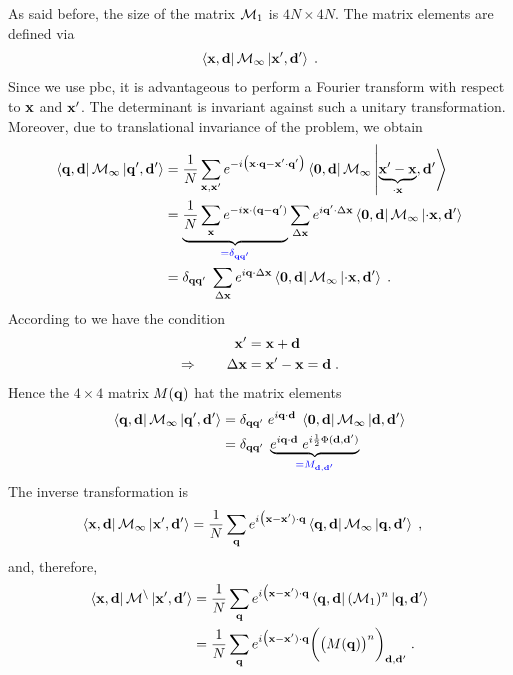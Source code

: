 As said before, the size of the matrix ${\cal M}_{1}$ is $4N\times 4N$. The matrix elements are defined via
%
\begin{align*}
\bra{\mathbf x,\mathbf d} {\cal M}_{1}\ket{\mathbf x',\mathbf d'}\;.
\end{align*}
%
Since we use pbc, it is advantageous to perform a Fourier transform with respect to $\mathbf x$ and 
$\mathbf x'$. The determinant is invariant against such a unitary transformation. Moreover, due to
translational invariance of the problem, we obtain
%
\begin{align*}
\bra{\mathbf q,\mathbf d} {\cal M}_{1}\ket{\mathbf q',\mathbf d'}&=
\frac{1}{N}\sum_{\mathbf x,\mathbf x'} e^{-i\big(\mathbf x\cdot \mathbf q-\mathbf x'\cdot \mathbf q'\big)}
\bra{\mathbf 0,\mathbf d} {\cal M}_{1}\ket{\underbrace{\mathbf x'-\mathbf x}_{\Delta\mathbf x},\mathbf d'}\\
&= \underbrace{
\frac{1}{N}\sum_{\mathbf x} e^{-i\mathbf x\cdot (\mathbf q-\mathbf q')}
}_{\color{blue} = \delta_{\mathbf q\mathbf q'}}\sum_{\Delta\mathbf x} e^{i \mathbf q'\cdot\Delta \mathbf x}
\bra{\mathbf 0,\mathbf d} {\cal M}_{1}\ket{\Delta\mathbf x,\mathbf d'}\\
&= \delta_{\mathbf q\mathbf q'}\;\sum_{\Delta\mathbf x} e^{i \mathbf q\cdot\Delta \mathbf x}
\bra{\mathbf 0,\mathbf d} {\cal M}_{1}\ket{\Delta\mathbf x,\mathbf d'}\;.
\end{align*}
%
According to  we have the condition 
%
\begin{align*}
\mathbf x' &= \mathbf x +\mathbf d\\
\Rightarrow\qquad \Delta \mathbf x &= \mathbf x' -\mathbf x = \mathbf d\;.
\end{align*}
%
Hence the $4\times 4$ matrix $M(\mathbf q)$ hat the matrix elements
%
\begin{align*}
\bra{\mathbf q,\mathbf d} {\cal M}_{1}\ket{\mathbf q',\mathbf d'}
&= \delta_{\mathbf q\mathbf q'}\; 
e^{i \mathbf q\cdot\mathbf d}\;
\bra{\mathbf 0,\mathbf d} {\cal M}_{1}\ket{\mathbf d,\mathbf d'}\\
&= \delta_{\mathbf q\mathbf q'}\; 
\underbrace{
e^{i \mathbf q\cdot\mathbf d}\;
e^{i\frac{1}{2}\Phi(\mathbf d,\mathbf d')}
}_{\color{blue} = M_{\mathbf d,\mathbf d'}}\\
\end{align*}
%
The inverse transformation is
%
\begin{align*}
\bra{\mathbf x,\mathbf d} {\cal M}_{1}\ket{\mathbf x',\mathbf d'}&=\frac{1}{N}
\sum_{\mathbf q} e^{i\big(\mathbf x-\mathbf x')\cdot \mathbf q }
\bra{\mathbf q,\mathbf d} {\cal M}_{1} \ket{\mathbf q,\mathbf d'}\;,
\end{align*}
%
and, therefore, 
%
\begin{align*}
\bra{\mathbf x,\mathbf d} {\cal M}^{n}\ket{\mathbf x',\mathbf d'}&=\frac{1}{N}
\sum_{\mathbf q} e^{i\big(\mathbf x-\mathbf x')\cdot \mathbf q }
\bra{\mathbf q,\mathbf d} ({\cal M}_{1})^{n} \ket{\mathbf q,\mathbf d'}\\
&=\frac{1}{N}
\sum_{\mathbf q} e^{i\big(\mathbf x-\mathbf x')\cdot \mathbf q }
\bigg(\big( M(\mathbf q) \big)^{n}\bigg)_{\mathbf d,\mathbf d'}\;.
\end{align*}
%

